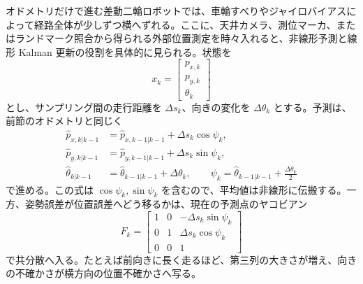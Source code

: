\begin{example}
オドメトリだけで進む差動二輪ロボットでは、車輪すべりやジャイロバイアスによって経路全体が少しずつ横へずれる。ここに、天井カメラ、測位マーカ、またはランドマーク照合から得られる外部位置測定を時々入れると、非線形予測と線形 Kalman 更新の役割を具体的に見られる。状態を
\begin{equation}
  x_k=
  \begin{bmatrix}
    p_{x,k}\\p_{y,k}\\\theta_k
  \end{bmatrix}
\end{equation}
とし、サンプリング間の走行距離を $\Delta s_k$、向きの変化を $\Delta\theta_k$ とする。予測は、前節のオドメトリと同じく
\begin{align}
  \hat{p}_{x,k|k-1}
  &=
  \hat{p}_{x,k-1|k-1}
  +\Delta s_k\cos\psi_k,\\
  \hat{p}_{y,k|k-1}
  &=
  \hat{p}_{y,k-1|k-1}
  +\Delta s_k\sin\psi_k,\\
  \hat{\theta}_{k|k-1}
  &=
  \hat{\theta}_{k-1|k-1}+\Delta\theta_k,
  \qquad
  \psi_k=\hat{\theta}_{k-1|k-1}+\frac{\Delta\theta_k}{2}
\end{align}
で進める。この式は $\cos\psi_k,\sin\psi_k$ を含むので、平均値は非線形に伝搬する。一方、姿勢誤差が位置誤差へどう移るかは、現在の予測点のヤコビアン
\begin{equation}
  F_k
  =
  \begin{bmatrix}
    1&0&-\Delta s_k\sin\psi_k\\
    0&1& \Delta s_k\cos\psi_k\\
    0&0&1
  \end{bmatrix}
\end{equation}
で共分散へ入る。たとえば前向きに長く走るほど、第三列の大きさが増え、向きの不確かさが横方向の位置不確かさへ写る。


\end{example}
